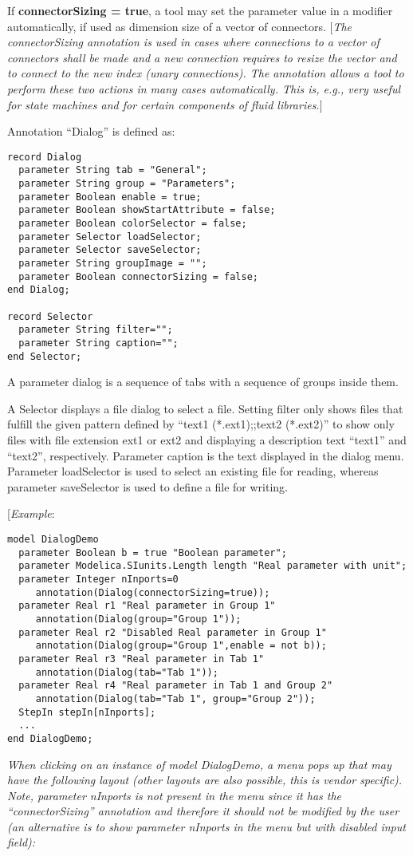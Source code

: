If \textbf{connectorSizing = true}, a tool may set the parameter value
in a modifier automatically, if used as dimension size of a vector of
connectors. {[}\emph{The connectorSizing annotation is used in cases
where connections to a vector of connectors shall be made and a new
connection requires to resize the vector and to connect to the new index
(unary connections). The annotation allows a tool to perform these two
actions in many cases automatically. This is, e.g., very useful for
state machines and for certain components of fluid libraries.}{]}

Annotation ``Dialog'' is defined as:

\begin{lstlisting}[language=modelica]
record Dialog
  parameter String tab = "General";
  parameter String group = "Parameters";
  parameter Boolean enable = true;
  parameter Boolean showStartAttribute = false;
  parameter Boolean colorSelector = false;
  parameter Selector loadSelector;
  parameter Selector saveSelector;
  parameter String groupImage = "";
  parameter Boolean connectorSizing = false;
end Dialog;

record Selector
  parameter String filter="";
  parameter String caption="";
end Selector;
\end{lstlisting}
A parameter dialog is a sequence of tabs with a sequence of groups
inside them.

A Selector displays a file dialog to select a file. Setting filter only
shows files that fulfill the given pattern defined by ``text1
(*.ext1);;text2 (*.ext2)'' to show only files with file extension
ext1 or ext2 and displaying a description text ``text1'' and
``text2'', respectively. Parameter caption is the text displayed in the
dialog menu. Parameter loadSelector is used to select an existing file
for reading, whereas parameter saveSelector is used to define a file for
writing.

{[}\emph{Example}:

\begin{lstlisting}[language=modelica]
model DialogDemo
  parameter Boolean b = true "Boolean parameter";
  parameter Modelica.SIunits.Length length "Real parameter with unit";
  parameter Integer nInports=0
     annotation(Dialog(connectorSizing=true));
  parameter Real r1 "Real parameter in Group 1"
     annotation(Dialog(group="Group 1"));
  parameter Real r2 "Disabled Real parameter in Group 1"
     annotation(Dialog(group="Group 1",enable = not b));
  parameter Real r3 "Real parameter in Tab 1"
     annotation(Dialog(tab="Tab 1"));
  parameter Real r4 "Real parameter in Tab 1 and Group 2"
     annotation(Dialog(tab="Tab 1", group="Group 2"));
  StepIn stepIn[nInports];
  ...
end DialogDemo;
\end{lstlisting}
\emph{When clicking on an instance of model DialogDemo, a menu pops up
that may have the following layout (other layouts are also possible,
this is vendor specific). Note, parameter nInports is not present in the
menu since it has the ``connectorSizing'' annotation and therefore it
should not be modified by the user (an alternative is to show parameter
nInports in the menu but with disabled input field): }

